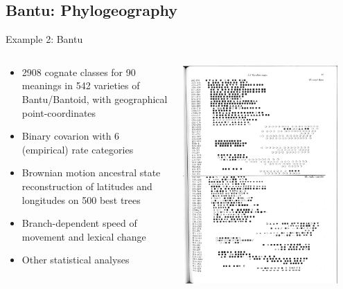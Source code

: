 \documentclass[9pt]{beamer}
\begin{document}
\subsection{Bantu: Phylogeography}
\begin{frame}{Example 2: Bantu}
  \begin{columns}
    \begin{column}{0.5\textwidth}
      \begin{itemize}
      \item 2908 cognate classes for 90 meanings in 542 varieties of Bantu/Bantoid,
        with geographical point-coordinates
      \item Binary covarion with 6 (empirical) rate categories
      \item Brownian motion ancestral state reconstruction of
        latitudes and longitudes on 500 best trees
      \item Branch-dependent speed of movement and lexical change
      \item Other statistical analyses
      \end{itemize}
    \end{column}
    \begin{column}{0.5\textwidth}
      \footnotemark\includegraphics[width=0.9\textwidth]{bantuwordlist.pdf}
    \end{column}
  \end{columns}
\end{frame}
\end{document}
